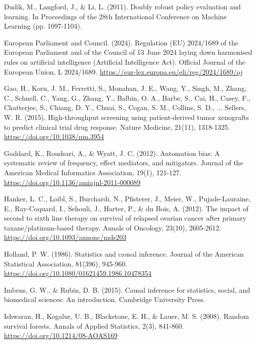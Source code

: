 Dud\'{i}k, M., Langford, J., \& Li, L. (2011). Doubly robust policy evaluation and learning. In Proceedings of the 28th International Conference on Machine Learning (pp. 1097-1104).

European Parliament and Council. (2024). Regulation (EU) 2024/1689 of the European Parliament and of the Council of 13 June 2024 laying down harmonised rules on artificial intelligence (Artificial Intelligence Act). Official Journal of the European Union, L 2024/1689. \url{https://eur-lex.europa.eu/eli/reg/2024/1689/oj}

Gao, H., Korn, J. M., Ferretti, S., Monahan, J. E., Wang, Y., Singh, M., Zhang, C., Schnell, C., Yang, G., Zhang, Y., Balbin, O. A., Barbe, S., Cai, H., Casey, F., Chatterjee, S., Chiang, D. Y., Chuai, S., Cogan, S. M., Collins, S. D., ... Sellers, W. R. (2015). High-throughput screening using patient-derived tumor xenografts to predict clinical trial drug response. Nature Medicine, 21(11), 1318-1325. \href{https://www.nature.com/articles/nm.3954}{https://doi.org/10.1038/nm.3954}

Goddard, K., Roudsari, A., \& Wyatt, J. C. (2012). Automation bias: A systematic review of frequency, effect mediators, and mitigators. Journal of the American Medical Informatics Association, 19(1), 121-127. \href{https://academic.oup.com/jamia/article-abstract/19/1/121/732254?redirectedFrom=fulltext}{https://doi.org/10.1136/amiajnl-2011-000089}

Hanker, L. C., Loibl, S., Burchardi, N., Pfisterer, J., Meier, W., Pujade-Lauraine, E., Ray-Coquard, I., Sehouli, J., Harter, P., \& du Bois, A. (2012). The impact of second to sixth line therapy on survival of relapsed ovarian cancer after primary taxane/platinum-based therapy. Annals of Oncology, 23(10), 2605-2612. \href{https://www.annalsofoncology.org/article/S0923-7534(19)37977-3/fulltext}{https://doi.org/10.1093/annonc/mds203}

Holland, P. W. (1986). Statistics and causal inference. Journal of the American Statistical Association, 81(396), 945-960. \href{https://www.tandfonline.com/doi/abs/10.1080/01621459.1986.10478354}{https://doi.org/10.1080/01621459.1986.10478354}

Imbens, G. W., \& Rubin, D. B. (2015). Causal inference for statistics, social, and biomedical sciences: An introduction. Cambridge University Press.

Ishwaran, H., Kogalur, U. B., Blackstone, E. H., \& Lauer, M. S. (2008). Random survival forests. Annals of Applied Statistics, 2(3), 841-860. \href{https://projecteuclid.org/journals/annals-of-applied-statistics/volume-2/issue-3/Random-survival-forests/10.1214/08-AOAS169.full}{https://doi.org/10.1214/08-AOAS169}

